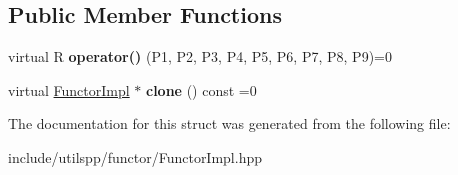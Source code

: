\subsection*{Public Member Functions}
\begin{DoxyCompactItemize}
\item 
\hypertarget{structutilspp_1_1FunctorImpl_3_01R_00_01TYPE__LIST__9_07P1_00_01P2_00_01P3_00_01P4_00_01P5_00_01P6_00_01P7_00_01P8_00_01P9_08_4_ac69cddf2796386a6ec08045e9baad88a}{virtual R {\bfseries operator()} (P1, P2, P3, P4, P5, P6, P7, P8, P9)=0}\label{structutilspp_1_1FunctorImpl_3_01R_00_01TYPE__LIST__9_07P1_00_01P2_00_01P3_00_01P4_00_01P5_00_01P6_00_01P7_00_01P8_00_01P9_08_4_ac69cddf2796386a6ec08045e9baad88a}

\item 
\hypertarget{structutilspp_1_1FunctorImpl_3_01R_00_01TYPE__LIST__9_07P1_00_01P2_00_01P3_00_01P4_00_01P5_00_01P6_00_01P7_00_01P8_00_01P9_08_4_a29210482c684830172a6a4e15c90ae93}{virtual \hyperlink{structutilspp_1_1FunctorImpl}{Functor\-Impl} $\ast$ {\bfseries clone} () const =0}\label{structutilspp_1_1FunctorImpl_3_01R_00_01TYPE__LIST__9_07P1_00_01P2_00_01P3_00_01P4_00_01P5_00_01P6_00_01P7_00_01P8_00_01P9_08_4_a29210482c684830172a6a4e15c90ae93}

\end{DoxyCompactItemize}


The documentation for this struct was generated from the following file\-:\begin{DoxyCompactItemize}
\item 
include/utilspp/functor/Functor\-Impl.\-hpp\end{DoxyCompactItemize}
